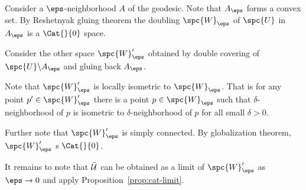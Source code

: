 Consider a $\eps$-neighborhood $A$ of the geodesic.
Note that $A_\eps$ forms a convex set.
By Reshetnyak gluing theorem the doubling $\spc{W}_\eps$ of $\spc{U}$ in $A_\eps$ is a $\Cat{}{0}$ space.

Consider the other space $\spc{W}'_\eps$ obtained by double covering of $\spc{U}\backslash A_\eps$ and gluing back $A_\eps$.

Note that $\spc{W}'_\eps$ is locally isometric to $\spc{W}_\eps$. 
That is for any point $p'\in\spc{W}'_\eps$ there is a point $p\in\spc{W}_\eps$ such that $\delta$-neighborhood of $p$ is isometric to $\delta$-neighborhood of $p$ for all small $\delta>0$.

Further note that $\spc{W}'_\eps$ is simply connected.
By globalization theorem, $\spc{W}'_\eps$ s $\Cat{}{0}$.

It remains to note that $\tilde{\mathcal{U}}$ can be obtained as a limit of $\spc{W}'_\eps$ as $\eps\to 0$ and apply Proposition~\ref{prop:cat-limit}.


